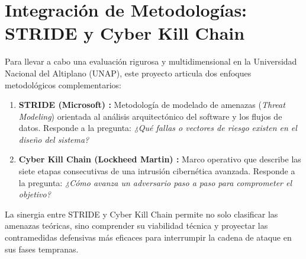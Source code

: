 \section{Integración de Metodologías: STRIDE y Cyber Kill Chain}
Para llevar a cabo una evaluación rigurosa y multidimensional en la Universidad Nacional del Altiplano (UNAP), este proyecto articula dos enfoques metodológicos complementarios:
\begin{enumerate}
    \item \textbf{STRIDE (Microsoft) \citep{kohnfelder1999threats,shostack2014threat}:} Metodología de modelado de amenazas (\textit{Threat Modeling}) orientada al análisis arquitectónico del software y los flujos de datos. Responde a la pregunta: \textit{¿Qué fallas o vectores de riesgo existen en el diseño del sistema?}
    \item \textbf{Cyber Kill Chain (Lockheed Martin) \citep{hutchins2011intelligence}:} Marco operativo que describe las siete etapas consecutivas de una intrusión cibernética avanzada. Responde a la pregunta: \textit{¿Cómo avanza un adversario paso a paso para comprometer el objetivo?}
\end{enumerate}

La sinergia entre STRIDE y Cyber Kill Chain permite no solo clasificar las amenazas teóricas, sino comprender su viabilidad técnica y proyectar las contramedidas defensivas más eficaces para interrumpir la cadena de ataque en sus fases tempranas.
